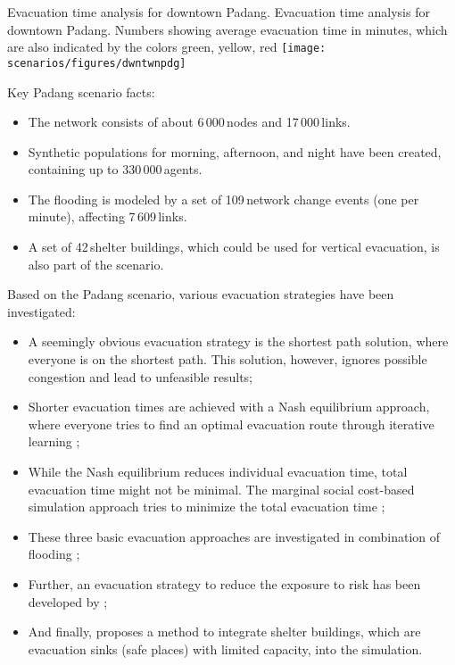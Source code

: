 %
\createfigure%
{Evacuation time analysis for downtown Padang.}%
{Evacuation time analysis for downtown Padang. Numbers showing average evacuation time in minutes, which are also indicated by the colors green, yellow, red}%
{\label{chap:using:padang}}%
{\texttt{[image: scenarios/figures/dwntwnpdg]}}%
{}

Key Padang scenario facts:
\begin{itemize}\styleItemize
\item The network consists of about 6\,000\,nodes and 17\,000\,links.
\item Synthetic populations for morning, afternoon, and night have been created, containing up to 330\,000\,agents.
\item The flooding is modeled by a set of 109\,network change events (one per minute), affecting 7\,609\,links.
\item A set of 42\,shelter buildings, which could be used for vertical evacuation, is also part of the scenario.
\end{itemize}
Based on the Padang scenario, various evacuation strategies have been investigated:
\begin{itemize}\styleItemize
\item A seemingly obvious evacuation strategy is the shortest path solution, where everyone is on the shortest path. This solution, however, ignores possible congestion and lead to unfeasible results;
\item Shorter evacuation times are achieved with a Nash equilibrium approach, where everyone tries to find an optimal evacuation route through iterative learning \citep{00LaemmelKluepfelNagel2009EvacPadangAtBookTimmermanns};
\item While the Nash equilibrium reduces individual evacuation time, total evacuation time might not be minimal. The marginal social cost-based simulation approach tries to minimize the total evacuation time \citep{00LaemmelFloetteroed2009KISysOptEvac,00DresslerFloetteroedLaemmelNagelSkutella2010OptimalEvacuationLargeScaleScenarios};
\item These three basic evacuation approaches are investigated in combination of flooding \citep{LaemmelGretherNagel2009TimeDependentNetworks,Laemmel_PhDThesis_2011};
\item Further, an evacuation strategy to reduce the exposure to risk has been developed by \citep{00LaemmelKluepfelNagel2010PEDRiskPrinted};
\item And finally, \citet{00FloetteroedLaemmel2010ICECShelterEvac} proposes a method to integrate shelter buildings, which are evacuation sinks (\ie safe places) 
with limited capacity, into the simulation.  
\end{itemize}

